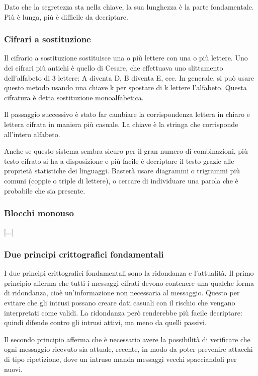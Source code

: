 Dato che la segretezza sta nella chiave, la sua lunghezza è la parte fondamentale.
Più è lunga, più è difficile da decriptare.

\subsubsection{Cifrari a sostituzione}
Il cifrario a sostituzione sostituisce una o più lettere con una o più lettere.
Uno dei cifrari più antichi è quello di Cesare, che effettuava uno slittamento dell'alfabeto di 3 lettere: A diventa D, B diventa E, ecc.
In generale, si può usare questo metodo usando una chiave k per spostare di k lettere l'alfabeto.
Questa cifratura è detta sostituzione monoalfabetica.

Il passaggio successivo è stato far cambiare la corrispondenza lettera in chiaro e lettera cifrata in maniera più casuale.
La chiave è la stringa che corrisponde all'intero alfabeto.

Anche se questo sistema sembra sicuro per il gran numero di combinazioni, 
più testo cifrato si ha a disposizione e più facile è decriptare il testo grazie alle proprietà statistiche dei linguaggi.
Basterà usare diagrammi o trigrammi più comuni (coppie o triple di lettere), o cercare di individuare una parola che è probabile che sia presente.

\subsubsection{Blocchi monouso}
[...]

\subsubsection{Due principi crittografici fondamentali}
I due principi crittografici fondamentali sono la ridondanza e l'attualità.
Il primo principio afferma che tutti i messaggi cifrati devono contenere una qualche forma di ridondanza, cioè un'informazione non necessaria al messaggio.
Questo per evitare che gli intrusi possano creare dati casuali con il rischio che vengano interpretati come validi.
La ridondanza però renderebbe più facile decriptare: quindi difende contro gli intrusi attivi, ma meno da quelli passivi. 

Il secondo principio afferma che è necessario avere la possibilità di verificare che ogni messaggio ricevuto sia attuale, recente, in modo da poter prevenire attacchi di tipo ripetizione, 
dove un intruso manda messaggi vecchi spacciandoli per nuovi.

